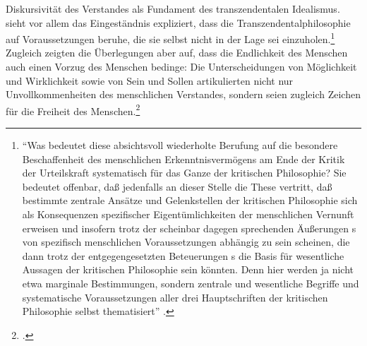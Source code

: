 Diskursivität des Verstandes als Fundament des transzendentalen Idealismus.
 sieht vor allem das Eingeständnis
expliziert, dass die Transzendentalphilosophie auf Voraussetzungen beruhe, die
sie selbst nicht in der Lage sei einzuholen.\footnote{\enquote{Was bedeutet
diese absichtsvoll wiederholte Berufung auf die besondere Beschaffenheit des
menschlichen Erkenntnisvermögens am Ende der Kritik der Urteilskraft systematisch
für das Ganze der kritischen Philosophie? Sie bedeutet
offenbar, daß  jedenfalls an dieser Stelle die These vertritt, daß bestimmte
zentrale Ansätze und Gelenkstellen der kritischen Philosophie sich als
Konsequenzen spezifischer Eigentümlichkeiten der menschlichen Vernunft erweisen
und insofern trotz der scheinbar dagegen sprechenden Äußerungen s von
spezifisch menschlichen Voraussetzungen abhängig zu sein scheinen, die dann
trotz der entgegengesetzten Beteuerungen s die Basis für wesentliche
Aussagen der kritischen Philosophie sein könnten. Denn hier werden ja nicht etwa
marginale Bestimmungen, sondern zentrale und wesentliche Begriffe und
systematische Voraussetzungen aller drei Hauptschriften der kritischen
Philosophie selbst thematisiert}
\parencite[][\pno~272\,f.]{Engfer:MenschlicheVernunft2002}.} Zugleich zeigten
die Überlegungen aber auf, dass die Endlichkeit des Menschen auch einen Vorzug des
Menschen bedinge: Die Unterscheidungen von Möglichkeit und Wirklichkeit sowie
von Sein und Sollen artikulierten nicht nur Unvollkommenheiten des menschlichen
Verstandes, sondern seien zugleich Zeichen für die Freiheit des
Menschen.\footnote{\cite[Vgl.][283]{Engfer:MenschlicheVernunft2002}.}

